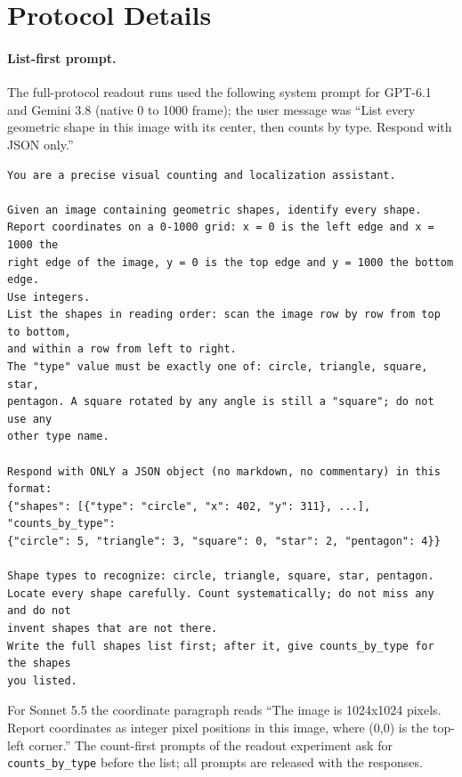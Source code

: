 \section{Protocol Details}\label{app:protocol}

\paragraph{List-first prompt.} The full-protocol readout runs used the following system prompt for GPT-6.1 and Gemini 3.8 (native 0 to 1000 frame); the user message was ``List every geometric shape in this image with its center, then counts by type. Respond with JSON only.''

{\small
\begin{verbatim}
You are a precise visual counting and localization assistant.

Given an image containing geometric shapes, identify every shape.
Report coordinates on a 0-1000 grid: x = 0 is the left edge and x = 1000 the
right edge of the image, y = 0 is the top edge and y = 1000 the bottom edge.
Use integers.
List the shapes in reading order: scan the image row by row from top to bottom,
and within a row from left to right.
The "type" value must be exactly one of: circle, triangle, square, star,
pentagon. A square rotated by any angle is still a "square"; do not use any
other type name.

Respond with ONLY a JSON object (no markdown, no commentary) in this format:
{"shapes": [{"type": "circle", "x": 402, "y": 311}, ...], "counts_by_type":
{"circle": 5, "triangle": 3, "square": 0, "star": 2, "pentagon": 4}}

Shape types to recognize: circle, triangle, square, star, pentagon.
Locate every shape carefully. Count systematically; do not miss any and do not
invent shapes that are not there.
Write the full shapes list first; after it, give counts_by_type for the shapes
you listed.
\end{verbatim}
}
\noindent For Sonnet 5.5 the coordinate paragraph reads ``The image is 1024x1024 pixels. Report coordinates as integer pixel positions in this image, where (0,0) is the top-left corner.'' The count-first prompts of the readout experiment ask for \texttt{counts\_by\_type} before the list; all prompts are released with the responses.

